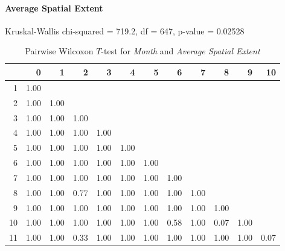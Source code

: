\paragraph{Average Spatial Extent}
Kruskal-Wallis chi-squared = 719.2, df = 647, p-value = 0.02528

\begin{table}[ht]
	\tiny
	\centering
	\begin{tabular}{rrrrrrrrrrrr}
		\toprule
		& 0 & 1 & 2 & 3 & 4 & 5 & 6 & 7 & 8 & 9 & 10 \\ 
		\midrule
		1  & 1.00 &  &  &  &  &  &  &  &  &  &  \\ 
		2  & 1.00 & 1.00 &  &  &  &  &  &  &  &  &  \\ 
		3  & 1.00 & 1.00 & 1.00 &  &  &  &  &  &  &  &  \\ 
		4  & 1.00 & 1.00 & 1.00 & 1.00 &  &  &  &  &  &  &  \\ 
		5  & 1.00 & 1.00 & 1.00 & 1.00 & 1.00 &  &  &  &  &  &  \\ 
		6  & 1.00 & 1.00 & 1.00 & 1.00 & 1.00 & 1.00 &  &  &  &  &  \\ 
		7  & 1.00 & 1.00 & 1.00 & 1.00 & 1.00 & 1.00 & 1.00 &  &  &  &  \\ 
		8  & 1.00 & 1.00 & 0.77 & 1.00 & 1.00 & 1.00 & 1.00 & 1.00 &  &  &  \\ 
		9  & 1.00 & 1.00 & 1.00 & 1.00 & 1.00 & 1.00 & 1.00 & 1.00 & 1.00 &  &  \\ 
		10 & 1.00 & 1.00 & 1.00 & 1.00 & 1.00 & 1.00 & 0.58 & 1.00 & 0.07 & 1.00 &  \\ 
		11 & 1.00 & 1.00 & 0.33 & 1.00 & 1.00 & 1.00 & 1.00 & 1.00 & 1.00 & 1.00 & 0.07 \\ 
		\bottomrule
	  \end{tabular}
    \caption{Pairwise Wilcoxon $T$-test for \textit{Month} and \textit{Average Spatial Extent}}
    \label{tbl:wilcoxon_baysis_effector_AUrs1_Cov}
\end{table}
